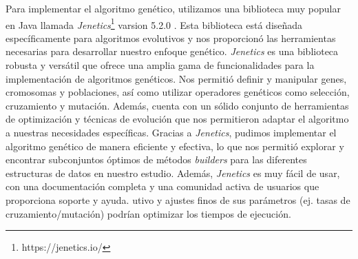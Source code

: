 Para implementar el algoritmo genético, utilizamos una biblioteca muy popular en Java llamada \emph{Jenetics}\footnote{https://jenetics.io/} varsion 5.2.0 . Esta biblioteca está diseñada específicamente para algoritmos evolutivos y nos proporcionó las herramientas necesarias para desarrollar nuestro enfoque genético.
\emph{Jenetics} es una biblioteca robusta y versátil que ofrece una amplia gama de funcionalidades para la implementación de algoritmos genéticos. Nos permitió definir y manipular genes, cromosomas y poblaciones, así como utilizar operadores genéticos como selección, cruzamiento y mutación. Además, cuenta con un sólido conjunto de herramientas de optimización y técnicas de evolución que nos permitieron adaptar el algoritmo a nuestras necesidades específicas.
Gracias a \emph{Jenetics}, pudimos implementar el algoritmo genético de manera eficiente y efectiva, lo que nos permitió explorar y encontrar subconjuntos óptimos de métodos \emph{builders} para las diferentes estructuras de datos en nuestro estudio. Además, \emph{Jenetics} es muy fácil de usar, con una documentación completa y una comunidad activa de usuarios que proporciona soporte y ayuda.
utivo y ajustes finos de sus parámetros (ej. tasas de cruzamiento/mutación) podrían optimizar los tiempos de ejecución.




